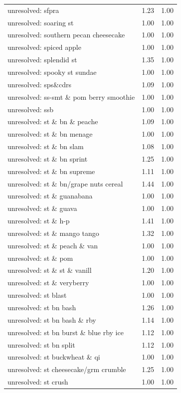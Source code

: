 \begin{table}
\begin{tabular}{lrr}
unresolved: sfpra & 1.23 & 1.00 \\
unresolved: soaring st & 1.00 & 1.00 \\
unresolved: southern pecan cheesecake & 1.00 & 1.00 \\
unresolved: spiced apple & 1.00 & 1.00 \\
unresolved: splendid st & 1.35 & 1.00 \\
unresolved: spooky st sundae & 1.00 & 1.00 \\
unresolved: sps\&cdrs & 1.09 & 1.00 \\
unresolved: ss-smt \& pom berry smoothie & 1.00 & 1.00 \\
unresolved: ssb & 1.00 & 1.00 \\
unresolved: st \& bn \& peache & 1.09 & 1.00 \\
unresolved: st \& bn menage & 1.00 & 1.00 \\
unresolved: st \& bn slam & 1.08 & 1.00 \\
unresolved: st \& bn sprint & 1.25 & 1.00 \\
unresolved: st \& bn supreme & 1.11 & 1.00 \\
unresolved: st \& bn/grape nuts cereal & 1.44 & 1.00 \\
unresolved: st \& guanabana & 1.00 & 1.00 \\
unresolved: st \& guava & 1.00 & 1.00 \\
unresolved: st \& h-p & 1.41 & 1.00 \\
unresolved: st \& mango tango & 1.32 & 1.00 \\
unresolved: st \& peach \& van & 1.00 & 1.00 \\
unresolved: st \& pom & 1.00 & 1.00 \\
unresolved: st \& st \& vanill & 1.20 & 1.00 \\
unresolved: st \& veryberry & 1.00 & 1.00 \\
unresolved: st blast & 1.00 & 1.00 \\
unresolved: st bn bash & 1.26 & 1.00 \\
unresolved: st bn bash \& rby & 1.14 & 1.00 \\
unresolved: st bn burst \& blue rby ice & 1.12 & 1.00 \\
unresolved: st bn split & 1.12 & 1.00 \\
unresolved: st buckwheat \& qi & 1.00 & 1.00 \\
unresolved: st cheesecake/grm crumble & 1.25 & 1.00 \\
unresolved: st crush & 1.00 & 1.00 \\

\end{tabular}
\end{table}
